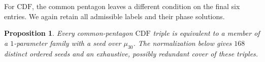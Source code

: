 \documentclass[11pt,a4paper]{article}
\newtheorem{proposition}[theorem]{Proposition}
\theoremstyle{plain}
\theoremstyle{definition}
\theoremstyle{plain}
\begin{document}
\medskip
For $\mathrm{CDF}$, the common pentagon leaves a different condition on the final six entries. We again retain all admissible labels and their phase solutions.

\par\addvspace{\medskipamount}\noindent
\begin{minipage}{\linewidth}
\begin{proposition}\label{n11_mixed:CDFcover}
Every common-pentagon $\mathrm{CDF}$ triple is equivalent to a member of a $1$-parameter family with a seed over $\mu_{30}$. The normalization below gives $168$ distinct ordered seeds and an exhaustive, possibly redundant cover of these triples.
\end{proposition}
\end{minipage}
\par\addvspace{\medskipamount}
\end{document}
